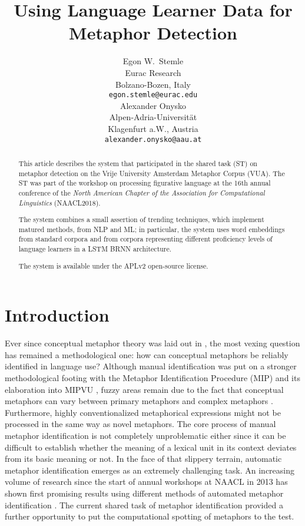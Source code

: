 \documentclass[11pt,a4paper]{article}
\title{Using Language Learner Data for Metaphor Detection}
\author{Egon W.~Stemle \\
  Eurac Research \\
  Bolzano-Bozen, Italy \\
  {\tt egon.stemle@eurac.edu} \\\And
  Alexander Onysko \\
  Alpen-Adria-Universität \\
  Klagenfurt a.W., Austria \\
  {\tt alexander.onysko@aau.at} \\}
\date{}
\begin{document}
\maketitle
\begin{abstract}
This article describes the system that participated in the shared task (ST) on metaphor detection \cite{Leong2018} on the Vrije University Amsterdam Metaphor Corpus (VUA).
The ST was part of the workshop on processing figurative language at the 16th annual conference of the \emph{North American Chapter of the Association for Computational Linguistics} (NAACL2018).

The system combines a small assertion of trending techniques, which implement matured methods, from NLP and ML; 
in particular, the system uses word embeddings from standard corpora and from corpora representing different proficiency levels of language learners in a LSTM BRNN architecture.

The system is available under the APLv2 open-source license.
\end{abstract}


\section{Introduction} %
\label{sec:intro}
 
Ever since conceptual metaphor theory was laid out in , the most vexing question has remained a methodological one: how can conceptual metaphors be reliably identified in language use? Although manual identification was put on a stronger methodological footing with the Metaphor Identification Procedure (MIP) \cite{doi:10.1080/10926480709336752} and its elaboration into MIPVU \cite{Steen2010}, fuzzy areas remain due to the fact that conceptual metaphors can vary between primary metaphors and complex metaphors \cite[cf.][]{Grady1997}. 
Furthermore, highly conventionalized metaphorical expressions might not be processed in the same way as novel metaphors. The core process of manual metaphor identification is not completely unproblematic either since it can be difficult to establish whether the meaning of a lexical unit in its context deviates from its basic meaning or not. 
In the face of that slippery terrain, automatic metaphor identification emerges as an extremely challenging task. 
An increasing volume of research since the start of annual workshops at NAACL in 2013 has shown first promising results using different methods of automated metaphor identification \cite[cf.][]{%
W14-2300,W15-1400,W16-1100}.
The current shared task of metaphor identification provided a further opportunity to put the computational spotting of metaphors to the test.
\end{document}
